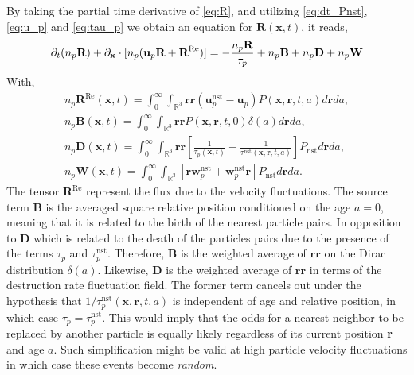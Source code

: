 By taking the partial time derivative of \ref{eq:R}, and utilizing \ref{eq:dt_Pnst}, \ref{eq:u_p} and \ref{eq:tau_p} we obtain an equation for $\textbf{R}(\textbf{x},t)$, it reads,
\begin{equation*}
    \partial_t (n_p\textbf{R})
    + {\partial_\textbf{x}} \cdot [n_p(\textbf{u}_p\textbf{R}
    + \textbf{R}^\text{Re})]
    = 
    - \frac{n_p\textbf{R}}{\tau_p}
    +n_p\textbf{B}
    + n_p\textbf{D}
    + n_p\textbf{W}
    \label{eq:dt_R}
\end{equation*}
With,
\begin{align*}
    n_p \textbf{R}^\text{Re}(\textbf{x},t)
    =
    \int_{0}^\infty
    \int_{\mathbb{R}^3}
    \textbf{rr}(\textbf{u}^\text{nst}_p - \textbf{u}_p)
    P(\textbf{x},\textbf{r},t,a)
    d\textbf{r}da,\\
    n_p \textbf{B}(\textbf{x},t)
    =
    \int_{0}^\infty
    \int_{\mathbb{R}^3}
    \textbf{rr}
    P(\textbf{x},\textbf{r},t,0)\delta(a)
    d\textbf{r}da, \\
    n_p\textbf{D}(\textbf{x},t) = 
    \int_{0}^\infty
    \int_{\mathbb{R}^3} \textbf{rr}
    \left[
        \frac{1}{\tau_p(\textbf{x},t)}
        - \frac{1}{\tau^\text{nst}(\textbf{x},\textbf{r},t,a)}
    \right]
    P_\text{nst}
    d\textbf{r}
    da,\\
    n_p \textbf{W}(\textbf{x},t) = 
    \int_{0}^\infty
    \int_{\mathbb{R}^3} \left[
        \textbf{r} \textbf{w}^\text{nst}_p
        + \textbf{w}^\text{nst}_p\textbf{r}
    \right]P_\text{nst}
    d\textbf{r}
    da.
\end{align*} 
The tensor $\textbf{R}^\text{Re}$ represent the flux due to the velocity fluctuations. 
The source term $\textbf{B}$ is the averaged square relative position conditioned on the age $a=0$, meaning that it is related to the birth of the nearest particle pairs. 
In opposition to \textbf{D} which is related to the death of the particles pairs due to the presence of the terms $\tau_p$ and $\tau_p^\text{nst}$.
Therefore, $\textbf{B}$ is the weighted average of $\textbf{rr}$ on the Dirac distribution $\delta(a)$. 
Likewise, $\textbf{D}$ is the weighted average of $\textbf{rr}$ in terms of the destruction rate fluctuation field. 
The former term cancels out under the hypothesis that $1 / \tau^\text{nst}_p(\textbf{x},\textbf{r},t,a)$ is independent of age and relative position, in which case $\tau_p = \tau^\text{nst}_p$. 
This would imply that the odds for a nearest neighbor to be replaced by another particle is equally likely regardless of its current position \textbf{r} and age $a$. 
Such simplification might be valid at high particle velocity fluctuations in which case these events become \textit{random}.
